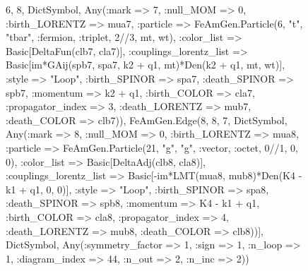 \documentclass{revtex4}
\begin{document}
\begin{figure}[!htb]
\begin{center}
{6, 8, Dict{Symbol, Any}(:mark => 7, :null_MOM => 0, :birth_LORENTZ => mua7, :particle => FeAmGen.Particle(6, "t", "tbar", :fermion, :triplet, 2//3, mt, wt), :color_list => Basic[DeltaFun(clb7, cla7)], :couplings_lorentz_list => Basic[im*GAij(spb7, spa7, k2 + q1, mt)*Den(k2 + q1, mt, wt)], :style => "Loop", :birth_SPINOR => spa7, :death_SPINOR => spb7, :momentum => k2 + q1, :birth_COLOR => cla7, :propagator_index => 3, :death_LORENTZ => mub7, :death_COLOR => clb7)), FeAmGen.Edge(8, 8, 7, Dict{Symbol, Any}(:mark => 8, :null_MOM => 0, :birth_LORENTZ => mua8, :particle => FeAmGen.Particle(21, "g", "g", :vector, :octet, 0//1, 0, 0), :color_list => Basic[DeltaAdj(clb8, cla8)], :couplings_lorentz_list => Basic[-im*LMT(mua8, mub8)*Den(K4 - k1 + q1, 0, 0)], :style => "Loop", :birth_SPINOR => spa8, :death_SPINOR => spb8, :momentum => K4 - k1 + q1, :birth_COLOR => cla8, :propagator_index => 4, :death_LORENTZ => mub8, :death_COLOR => clb8))], Dict{Symbol, Any}(:symmetry_factor => 1, :sign => 1, :n_loop => 1, :diagram_index => 44, :n_out => 2, :n_inc => 2)) 
}
\end{center}
\end{figure}
\end{document}
